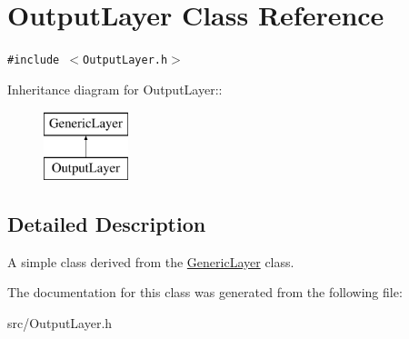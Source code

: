 \hypertarget{classOutputLayer}{
\section{Output\-Layer Class Reference}
\label{classOutputLayer}
}
{\tt \#include $<$Output\-Layer.h$>$}

Inheritance diagram for Output\-Layer::\begin{figure}[H]
\begin{center}
\leavevmode
\includegraphics[height=2cm]{classOutputLayer}
\end{center}
\end{figure}


\subsection{Detailed Description}
A simple class derived from the \hyperlink{classGenericLayer}{Generic\-Layer} class. 



The documentation for this class was generated from the following file:\begin{CompactItemize}
\item 
src/Output\-Layer.h\end{CompactItemize}
